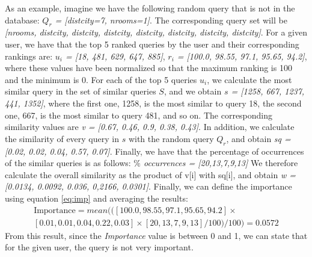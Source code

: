 \documentclass[sigconf]{acmart}
\begin{document}
As an example, imagine we have the following random query that is not in the database: \textit{$Q_r$ = [distcity=7, nrooms=1]}. The corresponding query set will be \textit{[nrooms, distcity, distcity, distcity, distcity, distcity, distcity, distcity]}. For a given user, we have that the top 5 ranked queries by the user and their corresponding rankings are: \textit{$u_i$ =  [18, 481, 629, 647, 885]}, \textit{$r_i$ = [100.0, 98.55, 97.1, 95.65, 94.2]}, where these values have been normalized so that the maximum ranking is 100 and the minimum is 0. For each of the top 5 queries $u_i$, we calculate the most similar query in the set of similar queries $S$, and we obtain \textit{$s$ = [1258, 667, 1237, 441, 1352]}, where the first one, 1258, is the most similar to query 18, the second one, 667, is the most similar to query 481, and so on. The corresponding similarity values are \textit{v = [0.67, 0.46, 0.9, 0.38, 0.43]}. In addition, we calculate the similarity of every query in $s$ with the random query $Q_r$, and obtain \textit{sq = [0.02, 0.02, 0.04, 0.57, 0.07]}. Finally, we have that the percentage of occurrences of the similar queries is as follows: \textit{$\%$ occurrences = [20,13,7,9,13]} We therefore calculate the overall similarity as the product of v[i] with sq[i], and obtain \textit{w = [0.0134, 0.0092, 0.036, 0,2166, 0.0301]}. Finally, we can define the importance using equation \ref{eq:imp} and averaging the results:
\begin{eqnarray}
    \mbox{Importance} = mean(([100.0, 98.55, 97.1, 95.65, 94.2] \times \\ \nonumber
    [0.01,0.01,0.04,0.22,0.03] \times [20,13,7,9,13]/100)/100) = 0.0572 \nonumber
\end{eqnarray}
From this result, since the \textit{Importance} value is between 0 and 1, we can state that for the given user, the query is not very important.

\begin{algorithm}
\end{algorithm}
\end{document}
